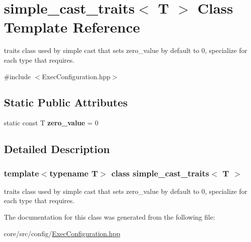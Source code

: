 \hypertarget{classsimple__cast__traits}{
\section{simple\_\-cast\_\-traits$<$ T $>$ Class Template Reference}
\label{classsimple__cast__traits}
}


traits class used by simple cast that sets zero\_\-value by default to 0, specialize for each type that requires.  




{\ttfamily \#include $<$ExecConfiguration.hpp$>$}

\subsection*{Static Public Attributes}
\begin{DoxyCompactItemize}
\item 
\hypertarget{classsimple__cast__traits_a69fa443539a4becd699563342d2f60ea}{
static const T {\bfseries zero\_\-value} = 0}
\label{classsimple__cast__traits_a69fa443539a4becd699563342d2f60ea}

\end{DoxyCompactItemize}


\subsection{Detailed Description}
\subsubsection*{template$<$typename T$>$ class simple\_\-cast\_\-traits$<$ T $>$}

traits class used by simple cast that sets zero\_\-value by default to 0, specialize for each type that requires. 

The documentation for this class was generated from the following file:\begin{DoxyCompactItemize}
\item 
core/src/config/\hyperlink{ExecConfiguration_8hpp}{ExecConfiguration.hpp}\end{DoxyCompactItemize}
